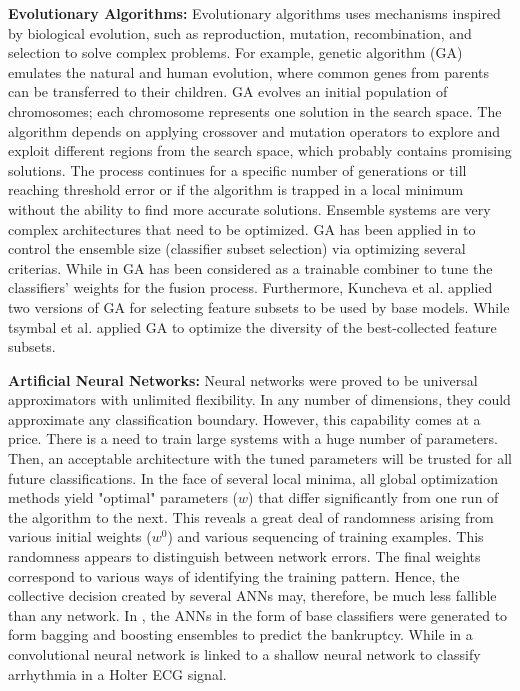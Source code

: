 \textbf{Evolutionary Algorithms:} Evolutionary algorithms uses mechanisms inspired by biological evolution, such as reproduction, mutation, recombination, and selection to solve complex problems. For example, genetic algorithm (GA) \cite{Holland1992} emulates the natural and human evolution, where common genes from parents can be transferred to their children. GA evolves an initial population of chromosomes; each chromosome represents one solution in the search space. The algorithm depends on applying crossover and mutation operators to explore and exploit different regions from the search space, which probably contains promising solutions. The process continues for a specific number of generations or till reaching threshold error or if the algorithm is trapped in a local minimum without the ability to find more accurate solutions. Ensemble systems are very complex architectures that need to be optimized. GA has been applied in \cite{ruta2005} to control the ensemble size (classifier subset selection) via optimizing several criterias. While in \cite{sikora2015} GA has been considered as a trainable combiner to tune the classifiers' weights for the fusion process. Furthermore,  Kuncheva et al. \cite{kuncheva2000d} applied two versions of GA for selecting feature subsets to be used by base models. While tsymbal et al. \cite{tsymbal2005} applied GA to optimize the diversity of the best-collected feature subsets.            

\textbf{Artificial Neural Networks:}
Neural networks were proved to be universal approximators with unlimited flexibility.  In any number of dimensions, they could approximate any classification boundary. However, this capability comes at a price. There is a need to train large systems with a huge number of parameters. Then, an acceptable architecture with the tuned parameters will be trusted for all future classifications. In the face of several local minima, all global optimization methods yield "optimal" parameters ($w$) that differ significantly from one run of the algorithm to the next. This reveals a great deal of randomness arising from various initial weights ($w^0$) and various sequencing of training examples. This randomness appears to distinguish between network errors. The final weights correspond to various ways of identifying the training pattern. Hence, the collective decision created by several ANNs may, therefore, be much less fallible than any network. In \cite{kim2010}, the ANNs in the form of base classifiers were generated to form bagging and boosting ensembles to predict the bankruptcy. While in \cite{plesinger2018} a convolutional neural network is linked to a shallow neural network to classify arrhythmia in a Holter ECG signal.


